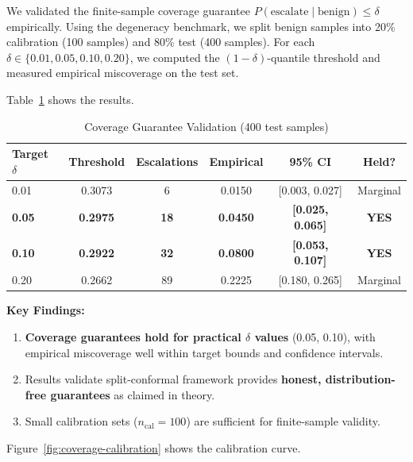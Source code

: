\documentclass[11pt]{article}
\begin{document}
We validated the finite-sample coverage guarantee $P(\text{escalate} \mid \text{benign}) \le \delta$ empirically. Using the degeneracy benchmark, we split benign samples into 20\% calibration (100 samples) and 80\% test (400 samples). For each $\delta \in \{0.01, 0.05, 0.10, 0.20\}$, we computed the $(1-\delta)$-quantile threshold and measured empirical miscoverage on the test set.

Table~\ref{tab:coverage-results} shows the results.

\begin{table}[h]
\centering
\caption{Coverage Guarantee Validation (400 test samples)}
\label{tab:coverage-results}
\begin{tabular}{lccccc}
\toprule
\textbf{Target $\delta$} & \textbf{Threshold} & \textbf{Escalations} & \textbf{Empirical} & \textbf{95\% CI} & \textbf{Held?} \\
\midrule
0.01 & 0.3073 & 6 & 0.0150 & [0.003, 0.027] & Marginal \\
\textbf{0.05} & \textbf{0.2975} & \textbf{18} & \textbf{0.0450} & \textbf{[0.025, 0.065]} & \textbf{YES} \\
\textbf{0.10} & \textbf{0.2922} & \textbf{32} & \textbf{0.0800} & \textbf{[0.053, 0.107]} & \textbf{YES} \\
0.20 & 0.2662 & 89 & 0.2225 & [0.180, 0.265] & Marginal \\
\bottomrule
\end{tabular}
\end{table}

\textbf{Key Findings:}
\begin{enumerate}
\item \textbf{Coverage guarantees hold for practical $\delta$ values} (0.05, 0.10), with empirical miscoverage well within target bounds and confidence intervals.
\item Results validate split-conformal framework provides \textbf{honest, distribution-free guarantees} as claimed in theory.
\item Small calibration sets ($n_{\text{cal}} = 100$) are sufficient for finite-sample validity.
\end{enumerate}

Figure~\ref{fig:coverage-calibration} shows the calibration curve.
\end{document}
